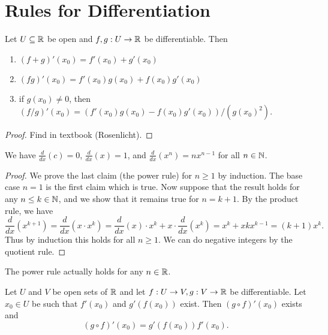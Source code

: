 \section{Rules for Differentiation}
\begin{prop}
  Let $U \subseteq \mathbb{R}$ be open and $f, g : U \to \mathbb{R}$
  be differentiable. Then
  \begin{enumerate}
    \item $(f + g)'(x_0) = f'(x_0) + g'(x_0)$
    \item $(fg)'(x_0) = f'(x_0)g(x_0) + f(x_0)g'(x_0)$
    \item if $g(x_0) \ne 0$, then $(f/g)'(x_0) = (f'(x_0)g(x_0) - f(x_0)g'(x_0)) / (g(x_0)^2)$.
  \end{enumerate}
\end{prop}

\begin{proof}
  Find in textbook (Rosenlicht).
\end{proof}

\begin{prop}
  We have $\frac{d}{dx}(c) = 0$, $\frac{d}{dx}(x) = 1$,
  and $\frac{d}{dx}(x^n) = nx^{n - 1}$ for all $n \in \mathbb{N}$.
\end{prop}

\begin{proof}
  We prove the last claim (the power rule) for
  $n \ge 1$ by induction. The base case
  $n = 1$ is the first claim which is true. Now suppose
  that the result holds for any $n \le k \in \mathbb{N}$, and
  we show that it remains true for $n = k + 1$. By
  the product rule, we have
  \[
    \frac{d}{dx} (x^{k + 1})
    = \frac{d}{dx} (x \cdot x^k)
    = \frac{d}{dx}(x) \cdot x^k + x \cdot \frac{d}{dx}(x^k) = x^k + xkx^{k - 1} = (k + 1)x^k.
  \]
  Thus by induction this holds for all $n \ge 1$.
  We can do negative integers by the quotient rule.
\end{proof}

\begin{remark}
  The power rule actually holds for any $n \in \mathbb{R}$.
\end{remark}

\begin{prop}
  Let $U$ and $V$ be open sets of $\mathbb{R}$ and let
  $f : U \to V, g : V \to \mathbb{R}$ be differentiable.
  Let $x_0 \in U$ be such that $f'(x_0)$ and
  $g'(f(x_0))$ exist. Then $(g \circ f)'(x_0)$ exists
  and
  \[(g \circ f)'(x_0) = g'(f(x_0)) f'(x_0).\]
\end{prop}

